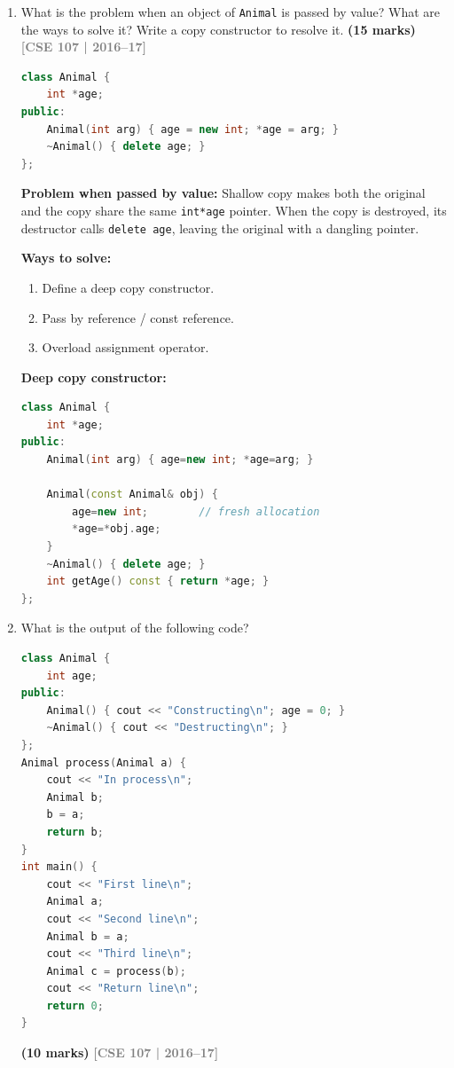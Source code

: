 \documentclass[12pt,a3paper]{article}
\newcommand{\yr}[1]{\hfill\textcolor{gray}{\small\textbf{[#1]}}}
\newcommand{\mk}[1]{\textcolor{orange!70!black}{\small\textbf{(#1 marks)}}}
\begin{document}
\begin{enumerate}
\item What is the problem when an object of \texttt{Animal} is passed by value? What are the ways to solve it? Write a copy constructor to resolve it. \mk{15}
\yr{CSE 107 | 2016--17}
\begin{lstlisting}[language=C++]
class Animal {
    int *age;
public:
    Animal(int arg) { age = new int; *age = arg; }
    ~Animal() { delete age; }
};
\end{lstlisting}



\begin{tcolorbox}[enhanced,breakable,ansbox,colback=cE!4,colframe=cE,
  boxrule=0.8pt,arc=5pt,
  title={\textbf{Answer --- Animal class --- copy constructor problem and fix}},
  fonttitle=\bfseries\color{white},colbacktitle=cE]

\textbf{Problem when passed by value:} Shallow copy makes both the
original and the copy share the same \texttt{int*age} pointer.
When the copy is destroyed, its destructor calls \texttt{delete age},
leaving the original with a dangling pointer.

\textbf{Ways to solve:}
\begin{enumerate}[label=(\roman*)]
  \item Define a deep copy constructor.
  \item Pass by reference / const reference.
  \item Overload assignment operator.
\end{enumerate}

\textbf{Deep copy constructor:}
\begin{lstlisting}[language=C++]
class Animal {
    int *age;
public:
    Animal(int arg) { age=new int; *age=arg; }

    Animal(const Animal& obj) {
        age=new int;        // fresh allocation
        *age=*obj.age;
    }
    ~Animal() { delete age; }
    int getAge() const { return *age; }
};
\end{lstlisting}

\end{tcolorbox}

\item What is the output of the following code?
\begin{lstlisting}[language=C++]
class Animal {
    int age;
public:
    Animal() { cout << "Constructing\n"; age = 0; }
    ~Animal() { cout << "Destructing\n"; }
};
Animal process(Animal a) {
    cout << "In process\n";
    Animal b;
    b = a;
    return b;
}
int main() {
    cout << "First line\n";
    Animal a;
    cout << "Second line\n";
    Animal b = a;
    cout << "Third line\n";
    Animal c = process(b);
    cout << "Return line\n";
    return 0;
}
\end{lstlisting}
\mk{10}
\yr{CSE 107 | 2016--17}


\end{enumerate}
\end{document}
